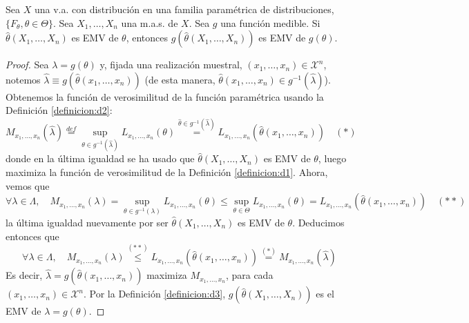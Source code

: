 \documentclass[12pt]{article}
\newcommand{\X}{\mathcal{X}}
\begin{document}
\begin{ejercicio}
\begin{enumerate}
            \begin{teo}\label{teo:t1}
                Sea $X$ una v.a. con distribución en una familia paramétrica de distribuciones, $\{F_\theta, \theta \in \Theta\}$. Sea $X_1, \ldots, X_n$
                una m.a.s. de $X$. Sea $g$ una función medible. Si $\hat{\theta}(X_1, \ldots, X_n)$ es EMV de $\theta$, entonces 
                $g(\hat{\theta}(X_1, \ldots, X_n))$ es EMV de $g(\theta)$.
            \end{teo}

            \begin{proof}
                Sea $\lambda = g(\theta)$ y, fijada una realización muestral, $(x_1, \ldots, x_n) \in \X^n$, notemos 
                $\hat{\lambda} \equiv g(\hat{\theta}(x_1, \ldots, x_n))$ (de esta manera, $\hat{\theta}(x_1, \ldots, x_n) \in g^{-1}(\hat{\lambda})$). \\

                Obtenemos la función de verosimilitud de la función paramétrica usando la Definición \ref{definicion:d2}:
                $$M_{x_1, \ldots, x_n} (\hat{\lambda}) \stackrel{def}{=} \sup_{\theta \in g^{-1}(\hat{\lambda})} L_{x_1, \ldots, x_n}(\theta) 
                \stackrel{\hat{\theta} \in g^{-1}(\hat{\lambda})}{=} L_{x_1, \ldots, x_n} (\hat{\theta}(x_1, \ldots, x_n)) \quad (*)$$
                donde en la última igualdad se ha usado que $\hat{\theta}(X_1, \ldots, X_n)$ es EMV de $\theta$, luego maximiza la función de 
                verosimilitud de la Definición \ref{definicion:d1}. Ahora, vemos que 
                $$\forall \lambda \in \Lambda, \quad M_{x_1, \ldots, x_n} (\lambda) = \sup_{\theta \in g^{-1}(\lambda)} L_{x_1, \ldots, x_n}(\theta) \leqslant
                \sup_{\theta \in \Theta} L_{x_1, \ldots, x_n}(\theta) = L_{x_1, \ldots, x_n} (\hat{\theta}(x_1, \ldots, x_n)) \quad (**)$$
                la última igualdad nuevamente por ser $\hat{\theta}(X_1, \ldots, X_n)$ es EMV de $\theta$. Deducimos entonces que 
                $$\forall \lambda \in \Lambda, \quad M_{x_1, \ldots, x_n} (\lambda) \stackrel{(**)}{\leqslant} L_{x_1, \ldots, x_n} (\hat{\theta}(x_1, \ldots, x_n))
                \stackrel{(*)}{=} M_{x_1, \ldots, x_n} (\hat{\lambda}) $$
                Es decir, $\hat{\lambda} = g(\hat{\theta}(x_1, \ldots, x_n))$ maximiza $M_{x_1, \ldots, x_n}$, para cada $(x_1, \ldots, x_n) \in \X^n$. 
                Por la Definición \ref{definicion:d3}, $g(\hat{\theta}(X_1, \ldots, X_n))$ es el EMV de $\lambda = g(\theta)$.
            \end{proof}


\end{enumerate}
\end{ejercicio}
\end{document}
